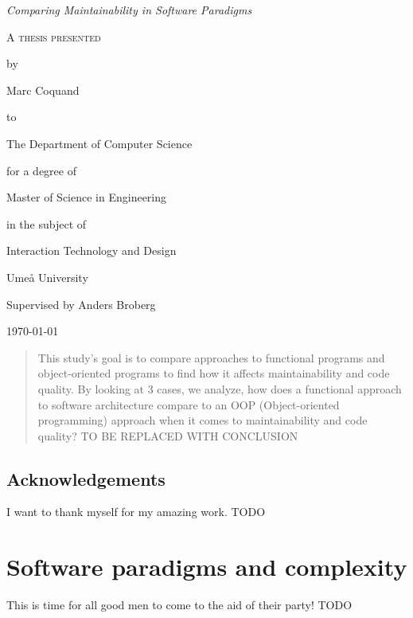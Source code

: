 \documentclass[12pt]{report}
\theoremstyle{definition}
\theoremstyle{theorem}
\begin{document}
\begin{titlepage}
	\centering
    \null
    \vfill
    {\Large\itshape Comparing Maintainability in Software Paradigms
    \par}
    \vspace{3.0cm}
	{\scshape 
    A thesis presented \par 
    by\par
	Marc Coquand\par
	to\par
    The Department of Computer Science\par
    \vspace{0.8cm}
	for a degree of\par
    Master of Science in Engineering\par
    in the subject of\par
    Interaction Technology and Design\par}
    \vfill
    Umeå University\par
    Supervised by Anders Broberg\par
	\today\par
\end{titlepage}
\clearpage
\thispagestyle{empty}

\clearpage\newpage
\thispagestyle{empty}

\begin{abstract} 

    This study's goal is to compare approaches to functional programs and
    object-oriented programs to find how it affects maintainability and code
    quality. By looking at 3 cases, we analyze, how does a functional approach
    to software architecture compare to an OOP (Object-oriented programming)
    approach when it comes to maintainability and code quality? TO BE REPLACED
    WITH CONCLUSION

\end{abstract}

\clearpage\newpage
\thispagestyle{empty}

\section*{Acknowledgements}

I want to thank myself for my amazing work. TODO

\clearpage\newpage
\thispagestyle{empty}

\tableofcontents
\newpage

\chapter{Software paradigms and complexity}
This is time for all good men to come to the aid of their party! TODO
\end{document}
